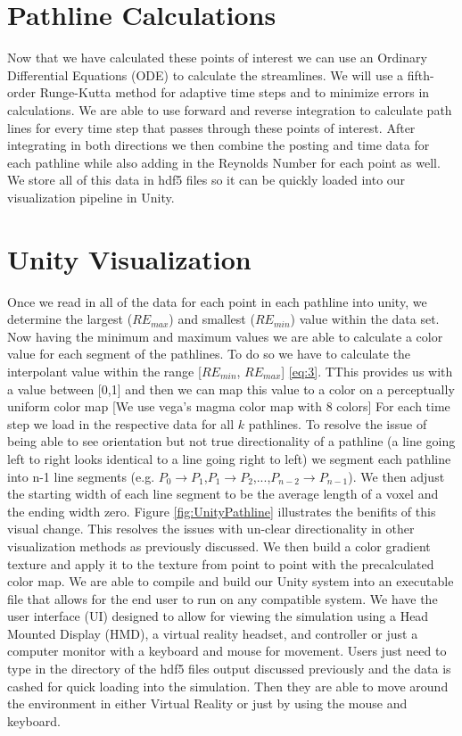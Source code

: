\section{Pathline Calculations}


Now that we have calculated these points of interest we can use an Ordinary Differential Equations (ODE) to calculate the streamlines. We will use a fifth-order Runge-Kutta method for adaptive time steps and to minimize errors in calculations. We are able to use forward and reverse integration to calculate path lines for every time step that passes through these points of interest. After integrating in both directions we then combine the posting and time data for each pathline while also adding in the Reynolds Number for each point as well. We store all of this data in hdf5 files so it can be quickly loaded into our visualization pipeline in Unity. 


\section{Unity Visualization}
Once we read in all of the data for each point in each pathline into unity, we determine the largest (\ensuremath{RE_{max}}) and smallest (\ensuremath{RE_{min}}) value within the data set.  Now having the minimum and maximum values we are  able to calculate a color value for each segment of the pathlines. To do so we have to calculate the interpolant value within the range [\ensuremath{RE_{min}}, \ensuremath{RE_{max}}] \ref{eq:3}. TThis provides us with a value between [0,1] and then we can map this value to a color on a perceptually uniform color map \color{red} [We use  vega's magma color map with 8 colors] \color{black} For each time step we load in the respective data for all \ensuremath{k} pathlines. To resolve the issue of being able to see orientation but not true directionality of a pathline (a line going left to right looks identical to a line going right to left) we segment each pathline into n-1 line segments  (e.g. \ensuremath{P_0\rightarrow P_1},\ensuremath{P_1 \rightarrow P_2},...,\ensuremath{P_{n-2} \rightarrow P_{n-1}}).
We then adjust the starting width of each line segment to be the average length of a voxel and the ending width zero. Figure \ref{fig:UnityPathline} illustrates the benifits of this visual change. This resolves the issues with un-clear directionality in other visualization methods as previously discussed. We then build a color gradient texture and apply it to the texture from point to point with the precalculated color map. We are able to compile and build our Unity system into an executable file that allows for the end user to run on any compatible system. We have the user interface (UI) designed to allow for viewing the simulation using a Head Mounted Display (HMD), a virtual reality headset, and controller or just a computer monitor with a keyboard and mouse for movement. Users just need to  type in the directory of the hdf5 files output discussed previously and the data is cashed for quick loading into the simulation. Then they are able to move around  the environment in either Virtual Reality or just by using the mouse and keyboard. 

